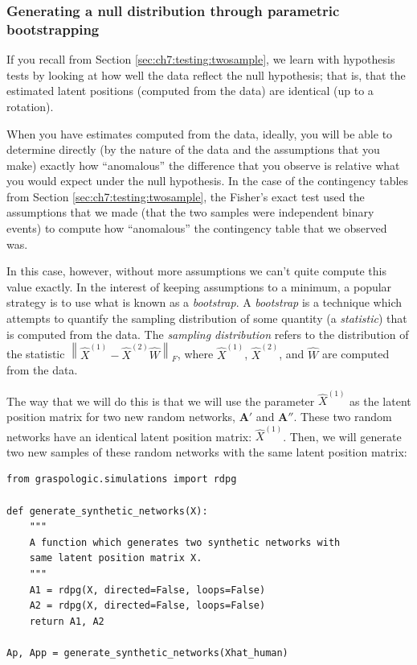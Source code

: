 \subsubsection{Generating a null distribution through parametric bootstrapping}

If you recall from Section \ref{sec:ch7:testing:twosample}, we learn with hypothesis tests by looking at how well the data reflect the null hypothesis; that is, that the estimated latent positions (computed from the data) are identical (up to a rotation). 

When you have estimates computed from the data, ideally, you will be able to determine directly (by the nature of the data and the assumptions that you make) exactly how ``anomalous'' the difference that you observe is relative what you would expect under the null hypothesis. In the case of the contingency tables from Section \ref{sec:ch7:testing:twosample}, the Fisher's exact test used the assumptions that we made (that the two samples were independent binary events) to compute how ``anomalous'' the contingency table that we observed was. 

In this case, however, without more assumptions we can't quite compute this value exactly. In the interest of keeping assumptions to a minimum, a popular strategy is to use what is known as a \textit{bootstrap}. A \textit{bootstrap} is a technique which attempts to quantify the sampling distribution of some quantity (a \textit{statistic}) that is computed from the data. The \textit{sampling distribution} refers to the distribution of the statistic $\left\|\hat X^{(1)} - \hat X^{(2)}\hat W\right\|_F$, where $\hat X^{(1)}$, $\hat X^{(2)}$, and $\hat W$ are computed from the data.

The way that we will do this is that we will use the parameter $\hat X^{(1)}$ as the latent position matrix for two new random networks, $\mathbf A'$ and $\mathbf A''$. These two random networks have an identical latent position matrix: $\hat X^{(1)}$. Then, we will generate two new samples of these random networks with the same latent position matrix:

\begin{lstlisting}[style=python]
from graspologic.simulations import rdpg

def generate_synthetic_networks(X):
    """
    A function which generates two synthetic networks with
    same latent position matrix X.
    """
    A1 = rdpg(X, directed=False, loops=False)
    A2 = rdpg(X, directed=False, loops=False)
    return A1, A2

Ap, App = generate_synthetic_networks(Xhat_human)
\end{lstlisting}

